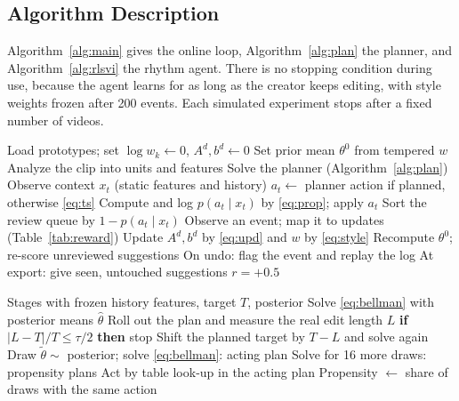 \documentclass{ieeeaccess}
\begin{document}
\subsection{Algorithm Description}
Algorithm~\ref{alg:main} gives the online loop, Algorithm~\ref{alg:plan} the planner, and Algorithm~\ref{alg:rlsvi} the rhythm agent. There is no stopping condition during use, because the agent learns for as long as the creator keeps editing, with style weights frozen after 200 events. Each simulated experiment stops after a fixed number of videos.

\begin{algorithm}[t]
\caption{Online Editing Agent for One Creator}
\label{alg:main}
\begin{algorithmic}[1]
\small
\STATE Load prototypes; set $\log w_k \leftarrow 0$, $A^{d},b^{d}\leftarrow 0$
\STATE Set prior mean $\theta^{0}$ from tempered $w$
\STATE Analyze the clip into units and features
\STATE Solve the planner (Algorithm~\ref{alg:plan})
\ENDIF
{}
\STATE Observe context $x_t$ (static features and history)
\STATE $a_t\leftarrow$ planner action if planned, otherwise \eqref{eq:ts}
\STATE Compute and log $p(a_t\mid x_t)$ by \eqref{eq:prop}; apply $a_t$
\ENDFOR
\STATE Sort the review queue by $1-p(a_t\mid x_t)$
\STATE Observe an event; map it to updates (Table~\ref{tab:reward})
\STATE Update $A^{d},b^{d}$ by \eqref{eq:upd} and $w$ by \eqref{eq:style}
\STATE Recompute $\theta^{0}$; re-score unreviewed suggestions
\STATE On undo: flag the event and replay the log
\ENDWHILE
\STATE At export: give seen, untouched suggestions $r=+0.5$
\ENDFOR
\end{algorithmic}
\end{algorithm}

\begin{algorithm}[t]
\caption{Target-Length Planner with Posterior Sampling}
\label{alg:plan}
\begin{algorithmic}[1]
\small
\REQUIRE Stages with frozen history features, target $T$, posterior
\STATE Solve \eqref{eq:bellman} with posterior means $\hat\theta$
\STATE Roll out the plan and measure the real edit length $L$
\STATE \textbf{if} $|L-T|/T \leq \tau/2$ \textbf{then} stop
\STATE Shift the planned target by $T-L$ and solve again
\ENDFOR
\STATE Draw $\tilde\theta\sim$ posterior; solve \eqref{eq:bellman}: acting plan
\STATE Solve for 16 more draws: propensity plans
\STATE Act by table look-up in the acting plan
\STATE Propensity $\leftarrow$ share of draws with the same action
\ENDFOR
\end{algorithmic}
\end{algorithm}
\end{document}
